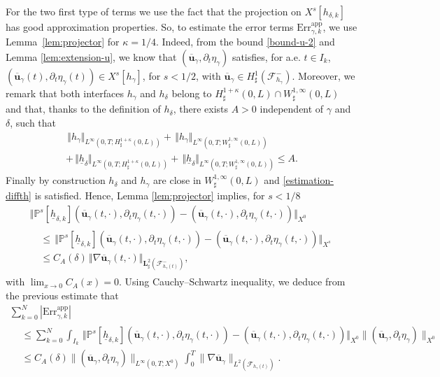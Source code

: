 \documentclass[10pt]{amsart}
\let\mathcal\mathscr
\newcommand{\app}{\mathrm{app}}
\newcommand{\Err}{\mathrm{Err}}
\theoremstyle{remark}
\theoremstyle{definition}
\newcommand{\norme}[1]{\,\Vert #1\Vert}
\newcommand{\ug}{\boldsymbol{u}}
\newcommand{\BS}[1]{\boldsymbol{#1}}
\newcommand{\hb}{{\underline{h}}}
\begin{document}
For the two first type of terms we use the fact that the projection on $X^s[h_{\delta, k}]$ has good approximation properties. So, to estimate the error terms $\Err^{\app}_{\gamma,k}$, we use Lemma~\ref{lem:projector} for $\kappa=1/4$. Indeed, from the bound \eqref{bound-u-2} and Lemma \eqref{lem:extension-u}, we know that $(\overline{\ug}_{\gamma},\partial_t \eta_\gamma)$ satisfies, for a.e. $t \in I_k$, $(\overline{\ug}_{\gamma}(t),\partial_t \eta_{\gamma}(t)) \in X^s[h_{\gamma}]$, for $s<1/2$, with $\overline{\ug}_{\gamma} \in H_\sharp^1(\mathcal F^-_{h_{\gamma}})$. Moreover, we remark that both interfaces $h_{\gamma}$ and $h_\delta$ belong to $H^{1+\kappa}_{\sharp}(0,L) \cap W_\sharp^{1,\infty}(0,L)$ and that, thanks to the definition of $h_\delta$, there exists $A >0$ independent of $\gamma$ and $\delta$, such that\vspace*{-5pt}
\begin{multline*}
\norme{h_{\gamma}}_{L^{\infty}(0,T;H^{1+\kappa}_{\sharp}(0,L))}+\norme{h_{\gamma}}_{L^{\infty}(0,T;W^{1,\infty}_{\sharp}(0,L))} \\
+\norme{\hb_{\delta}}_{L^{\infty}(0,T;H^{1+\kappa}_{\sharp}(0,L))}+\norme{\hb_{\delta}}_{L^{\infty}(0,T;W^{1,\infty}_{\sharp}(0,L))}\leq A.
\end{multline*}
Finally by construction $h_\delta$ and $h_\gamma$ are close in $W^{1, \infty}_\sharp(0, L)$ and \eqref{estimation-diffth} is satisfied.
Hence,
Lemma \ref{lem:projector} implies, for $s<1/8$\vspace*{-3pt}
\begin{multline*}
\norme{\mathbb{P}^{s}[\hb_{\delta, k}](\overline{\ug}_{\gamma}(t,\cdot),\partial_{t}\eta_{\gamma}(t,\cdot)) -(\overline{\ug}_{\gamma}(t,\cdot),\partial_{t}\eta_{\gamma}(t,\cdot))}_{X^0} \\
\begin{aligned}
&\leq\norme{\mathbb{P}^{s}[\hb_{\delta, k}](\overline{\ug}_{\gamma}(t,\cdot),\partial_{t}\eta_{\gamma}(t,\cdot)) -(\overline{\ug}_{\gamma}(t,\cdot),\partial_{t}\eta_{\gamma}(t,\cdot))}_{X^s}\\
&\leq C_{A}(\delta)\norme{\nabla \overline{\ug}_{\gamma}(t,\cdot)}_{\BS{L}^{2}_{\sharp}(\mathcal{F}^{-}_{h_{\gamma}(t)})},
\end{aligned}
\end{multline*}
with $\lim_{x\to 0} C_A(x)=0$.
Using Cauchy--Schwartz inequality, we deduce from the previous estimate that\vspace*{-5pt}
\begin{multline*}
\sum_{k=0}^N |\Err_{\gamma,k}^{\app}| \\[-8pt]
\begin{aligned}
& \leq \sum_{k=0}^N \int_{I_k} \norme{\mathbb{P}^{s}[\hb_{\delta, k}](\overline{\ug}_{\gamma}(t,\cdot),\partial_{t}\eta_{\gamma}(t,\cdot)) -(\overline{\ug}_{\gamma}(t,\cdot),\partial_{t}\eta_{\gamma}(t,\cdot))}_{X^0}
\|(\overline{\ug}_{\gamma},\partial_t \eta_{\gamma})\|_{X^0} \\
& \leq C_A({\delta})\|(\overline{\ug}_{\gamma},\partial_t \eta_{\gamma})\|_{L^\infty(0, T;X^0)} \int_0^T \|\nabla \overline{\ug}_{\gamma}\|_{L^2(\mathcal F_{h_{\gamma}(t)})}.
\end{aligned}
\end{multline*}
\end{document}
